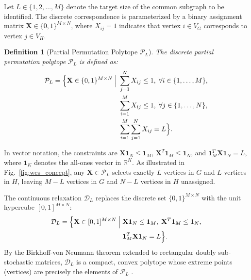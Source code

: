 \documentclass[conference]{IEEEtran}
\newtheorem{definition}{Definition}
\begin{document}
Let $L \in \{1, 2, \ldots, M\}$ denote the target size of the common subgraph to be identified. The discrete correspondence is parameterized by a binary assignment matrix $\mathbf{X} \in \{0, 1\}^{M \times N}$, where $X_{ij} = 1$ indicates that vertex $i \in V_G$ corresponds to vertex $j \in V_H$.

\begin{definition}[Partial Permutation Polytope $\mathcal{P}_L$]
The discrete partial permutation polytope $\mathcal{P}_L$ is defined as:
\begin{align}
\mathcal{P}_L = \Big\{ \mathbf{X} \in \{0, 1\}^{M \times N} \;\Big|\; 
&\sum_{j=1}^N X_{ij} \leq 1, \; \forall i \in \{1, \ldots, M\}, \notag\\
&\sum_{i=1}^M X_{ij} \leq 1, \; \forall j \in \{1, \ldots, N\}, \notag\\
&\sum_{i=1}^M \sum_{j=1}^N X_{ij} = L \Big\}.
\label{eq:polytope_discrete}
\end{align}
\end{definition}

In vector notation, the constraints are $\mathbf{X}\mathbf{1}_N \leq \mathbf{1}_M$, $\mathbf{X}^T\mathbf{1}_M \leq \mathbf{1}_N$, and $\mathbf{1}_M^T\mathbf{X}\mathbf{1}_N = L$, where $\mathbf{1}_K$ denotes the all-ones vector in $\mathbb{R}^K$. As illustrated in Fig.~\ref{fig:wcs_concept}, any $\mathbf{X} \in \mathcal{P}_L$ selects exactly $L$ vertices in $G$ and $L$ vertices in $H$, leaving $M - L$ vertices in $G$ and $N - L$ vertices in $H$ unassigned.

The continuous relaxation $\mathcal{D}_L$ replaces the discrete set $\{0, 1\}^{M \times N}$ with the unit hypercube $[0, 1]^{M \times N}$:
\begin{align}
\mathcal{D}_L = \Big\{ \mathbf{X} \in [0, 1]^{M \times N} \;\Big|\; 
&\mathbf{X}\mathbf{1}_N \leq \mathbf{1}_M, \; \mathbf{X}^T\mathbf{1}_M \leq \mathbf{1}_N, \notag\\
&\mathbf{1}_M^T\mathbf{X}\mathbf{1}_N = L \Big\}.
\label{eq:polytope_continuous}
\end{align}
By the Birkhoff-von Neumann theorem extended to rectangular doubly sub-stochastic matrices, $\mathcal{D}_L$ is a compact, convex polytope whose extreme points (vertices) are precisely the elements of $\mathcal{P}_L$ \cite{birkhoff1946}.
\end{document}
